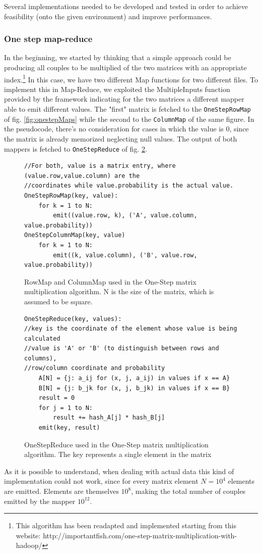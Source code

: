 Several implementations needed to be developed and tested in order to
achieve feasibility (onto the given environment) and improve performances.

\subsubsection{One step map-reduce}
In the beginning, we started by thinking that a simple approach could be producing all
couples to be multiplied of the two matrices with an appropriate index.\footnote{This algorithm
has been readapted and implemented starting from this website: http://importantfish.com/one-step-matrix-multiplication-with-hadoop/}
In this case, we have two different Map functions for two different files. To implement this in Map-Reduce, we exploited
the MultipleInputs function provided by the framework indicating for the two matrices a different mapper able
to emit different values.
The "first" matrix is fetched to the \texttt{OneStepRowMap} of fig. \ref{fig:onestepMaps} while the second to the \texttt{ColumnMap} of the same figure. In the pseudocode, there's no consideration for cases in which the value is 0, since the
matrix is already memorized neglecting null values.
The output of both mappers is fetched to \texttt{OneStepReduce} of fig. \ref{fig:onestepReduce}.
\begin{figure}[H]
\begin{verbatim}
//For both, value is a matrix entry, where (value.row,value.column) are the
//coordinates while value.probability is the actual value.
OneStepRowMap(key, value):
    for k = 1 to N:
        emit((value.row, k), ('A', value.column, value.probability))
OneStepColumnMap(key, value)
    for k = 1 to N:
        emit((k, value.column), ('B', value.row, value.probability))
\end{verbatim}
\caption{RowMap and ColumnMap used in the One-Step matrix multiplication algorithm. N is the size of the matrix, which is assumed to be square.}
\label{fig:onestep}
\end{figure}

\begin{figure}[H]
\begin{verbatim}
OneStepReduce(key, values):
//key is the coordinate of the element whose value is being calculated
//value is 'A' or 'B' (to distinguish between rows and columns), 
//row/column coordinate and probability
    A[N] = {j: a_ij for (x, j, a_ij) in values if x == A}
    B[N] = {j: b_jk for (x, j, b_jk) in values if x == B}
    result = 0
    for j = 1 to N:
        result += hash_A[j] * hash_B[j]
    emit(key, result)
\end{verbatim}
\caption{OneStepReduce used in the One-Step matrix multiplication algorithm. The key represents a single element in the matrix}
\label{fig:onestepReduce}
\end{figure}
As it is possible to understand, when dealing with actual data this kind of implementation could not
work, since for every matrix element $N=10^4$ elements are emitted. 
Elements are themselves $10^8$, making the total number of couples emitted by the mapper $10^{12}$.


